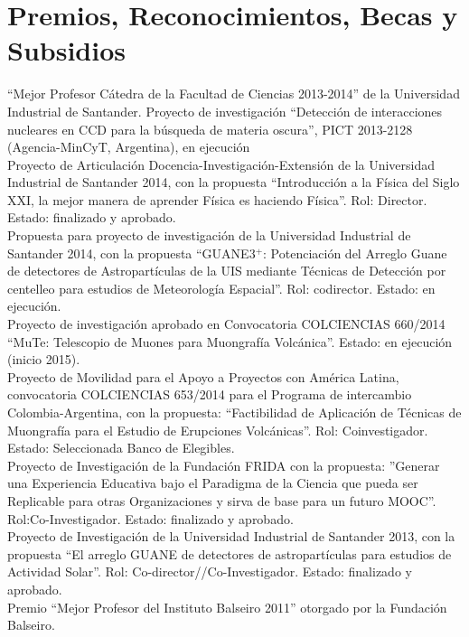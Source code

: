 \section*{Premios, Reconocimientos, Becas y Subsidios}
\noindent
{} ``Mejor Profesor Cátedra de la Facultad de Ciencias 2013-2014'' de la Universidad Industrial de Santander.
 Proyecto de investigación ``Detección de interacciones nucleares en CCD para la búsqueda de materia oscura'', PICT 2013-2128 (Agencia-MinCyT, Argentina), en ejecución\\
 Proyecto de Articulación Docencia-Investigación-Extensión de la Universidad Industrial de Santander 2014, con la propuesta ``Introducción a la Física del Siglo XXI, la mejor manera de aprender Física es haciendo Física''. Rol: Director. Estado: finalizado y aprobado.\\
 Propuesta para proyecto de investigación de la Universidad Industrial de Santander 2014, con la propuesta ``GUANE3$^+$: Potenciación del Arreglo Guane de detectores de Astropartículas de la UIS mediante Técnicas de Detección por centelleo para estudios de Meteorología Espacial''. Rol: codirector. Estado: en ejecución.\\
 Proyecto de investigación aprobado en Convocatoria COLCIENCIAS 660/2014 ``MuTe: Telescopio de Muones para Muongrafía Volcánica''. Estado: en ejecución (inicio 2015).\\
 Proyecto de Movilidad para el Apoyo a Proyectos con América Latina, convocatoria COLCIENCIAS 653/2014 para el Programa de intercambio Colombia-Argentina, con la propuesta: ``Factibilidad de Aplicación de Técnicas de Muongrafía para el Estudio de Erupciones Volcánicas''. Rol: Coinvestigador. Estado: Seleccionada Banco de Elegibles.\\
 Proyecto de Investigación de la Fundación FRIDA con la propuesta: ''Generar una Experiencia Educativa bajo el Paradigma de la Ciencia que pueda ser Replicable para otras Organizaciones y sirva de base para un futuro MOOC''. Rol:Co-Investigador. Estado: finalizado y aprobado.\\
 Proyecto de Investigación de la Universidad Industrial de Santander 2013, con la propuesta ``El arreglo GUANE de detectores de astropartículas para estudios de Actividad Solar''. Rol: Co-director//Co-Investigador. Estado: finalizado y aprobado.\\
Premio ``Mejor Profesor del Instituto Balseiro 2011'' otorgado por la Fundación Balseiro.\\
